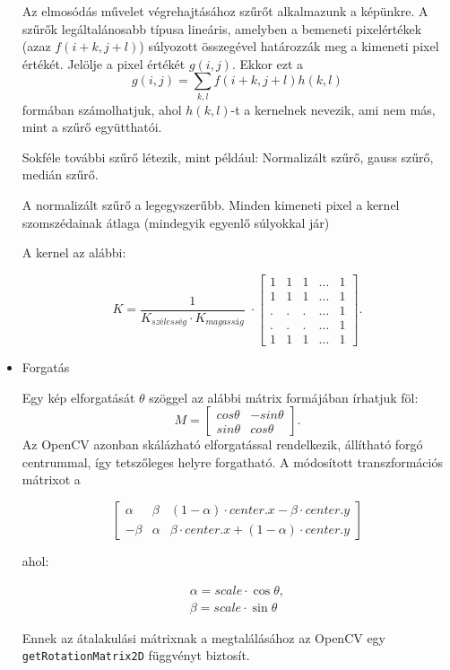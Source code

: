 \begin{itemize}
Az elmosódás művelet végrehajtásához szűrőt alkalmazunk a képünkre. A szűrők legáltalánosabb típusa lineáris, amelyben a bemeneti pixelértékek (azaz $f(i+k, j+l)$) súlyozott összegével határozzák meg a kimeneti pixel értékét. Jelölje a pixel értékét $g(i, j)$. Ekkor ezt a
$$
g(i, j) = \sum_{k, l} f(i + k, j + l) h(k, l)
$$
formában számolhatjuk, ahol $h(k, l)$-t a kernelnek nevezik, ami nem más, mint a szűrő együtthatói.

Sokféle további szűrő létezik, mint például: Normalizált szűrő, gauss szűrő, medián szűrő.

A normalizált szűrő a legegyszerűbb. Minden kimeneti pixel a kernel szomszédainak átlaga (mindegyik egyenlő súlyokkal jár)

A kernel az alábbi:

\[K = \dfrac{1}{K_{szélesség} \cdot K_{magasság}} \;
\cdot
\left[
\begin{matrix}
    1 & 1 & 1 & ... & 1 \\
    1 & 1 & 1 & ... & 1 \\
    . &. &. & ... & 1 \\
    . &. &. & ... & 1 \\
    1 & 1 & 1 & ... & 1   
\end{matrix}
\right].
\]
\item Forgatás

Egy kép elforgatását $\theta$ szöggel az alábbi mátrix formájában írhatjuk föl:
$$
M = \begin{bmatrix} cos\theta & -sin\theta \\ sin\theta & cos\theta   \end{bmatrix}.
$$
Az OpenCV azonban skálázható elforgatással rendelkezik, állítható forgó centrummal, így tetszőleges helyre forgatható. A módosított transzformációs mátrixot a

$$\begin{bmatrix}
\alpha &  \beta & (1- \alpha )  \cdot center.x -  \beta \cdot center.y \\ - \beta &  \alpha &  \beta \cdot center.x + (1- \alpha )  \cdot center.y
\end{bmatrix}$$

ahol:

$$\begin{array}{l}
\alpha =  scale \cdot \cos \theta , \\ \beta =  scale \cdot \sin \theta
\end{array}$$

Ennek az átalakulási mátrixnak a megtalálásához az OpenCV egy \\ \texttt{getRotationMatrix2D} függvényt biztosít.


\end{itemize}
